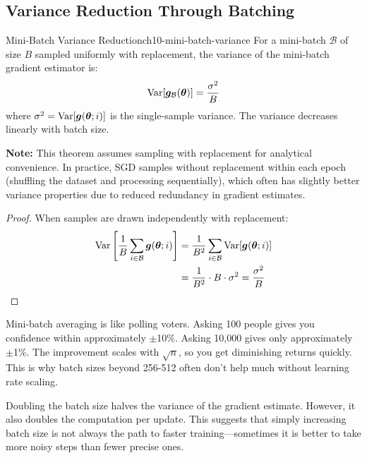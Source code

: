 \documentclass[../../main.tex]{subfiles}
\begin{document}
\subsection{Variance Reduction Through Batching}

\begin{theorem}{Mini-Batch Variance Reduction}{ch10-mini-batch-variance}
For a mini-batch $\mathcal{B}$ of size $B$ sampled uniformly with replacement, the variance of the mini-batch gradient estimator is:
\[
    \operatorname{Var}[\boldsymbol{g}_\mathcal{B}(\boldsymbol{\theta})] = \frac{\sigma^2}{B}
\]
where $\sigma^2 = \operatorname{Var}[\boldsymbol{g}(\boldsymbol{\theta}; i)]$ is the single-sample variance. The variance decreases linearly with batch size.

\textbf{Note:} This theorem assumes sampling with replacement for analytical convenience. In practice, SGD samples without replacement within each epoch (shuffling the dataset and processing sequentially), which often has slightly better variance properties due to reduced redundancy in gradient estimates.
\end{theorem}

\begin{proof}
When samples are drawn independently with replacement:
\begin{align*}
    \operatorname{Var}\left[\frac{1}{B}\sum_{i \in \mathcal{B}} \boldsymbol{g}(\boldsymbol{\theta}; i)\right] &= \frac{1}{B^2} \sum_{i \in \mathcal{B}} \operatorname{Var}[\boldsymbol{g}(\boldsymbol{\theta}; i)] \\
    &= \frac{1}{B^2} \cdot B \cdot \sigma^2 = \frac{\sigma^2}{B}
\end{align*}
\end{proof}

\begin{intuition}
Mini-batch averaging is like polling voters. Asking 100 people gives you confidence within approximately $\pm$10\%. Asking 10,000 gives only approximately $\pm$1\%. The improvement scales with $\sqrt{n}$, so you get diminishing returns quickly. This is why batch sizes beyond 256-512 often don't help much without learning rate scaling.
\end{intuition}

\begin{intuition}
Doubling the batch size halves the variance of the gradient estimate. However, it also doubles the computation per update. This suggests that simply increasing batch size is not always the path to faster training---sometimes it is better to take more noisy steps than fewer precise ones.
\end{intuition}
\end{document}

